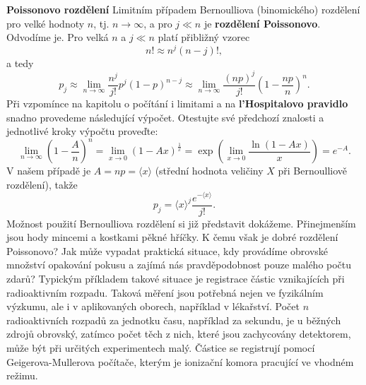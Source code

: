 \wikitextrule
\begin{example}\label{mai:exam068}
  \textbf{Poissonovo rozdělení}\newline\small
  Limitním případem Bernoulliova (binomického) rozdělení pro velké hodnoty \(n\), tj. \(n 
  \rightarrow \infty\), a pro \(j \ll n\) je \textbf{rozdělení Poissonovo}. Odvodíme je. Pro velká 
  \(n\) a \(j \ll n\) platí přibližný vzorec
  \begin{equation*}
    n! \approx n^j(n-j)!,
  \end{equation*}
  a tedy
  \begin{equation*}
    p_j \approx \lim\limits_{n\rightarrow\infty}\dfrac{n^j}{j!}p^j(1-p)^{n - j}
        \approx \lim\limits_{n\rightarrow\infty}\dfrac{(np)^j}{j!}\left(1-\dfrac{np}{n}\right)^{n}.
  \end{equation*}
  Při vzpomínce na kapitolu o počítání i limitami a na \textbf{l’Hospitalovo pravidlo} snadno 
  provedeme následující výpočet. Otestujte své předchozí znalosti a jednotlivé kroky výpočtu 
  proveďte:
  \begin{equation*}
    \lim\limits_{n\rightarrow\infty}\left(1 - \dfrac{A}{n}\right)^n = 
    \lim\limits_{x\rightarrow0}\left(1 - Ax\right)^\frac{1}{x} =
    \exp\left(\lim\limits_{x\rightarrow0}\dfrac{\ln(1 - Ax)}{x}\right) = e^{-A}.
  \end{equation*}
  V našem případě je \(A = np = \langle x \rangle\) (střední hodnota veličiny \(X\) při 
  Bernoulliově rozdělení), takže
  \begin{equation}\label{mai:eq065}
    p_j = \langle x \rangle^j\dfrac{e^{-\langle x \rangle}}{j!}.
  \end{equation}
  Možnost použití Bernoulliova rozdělení si již představit dokážeme. Přinejmenším jsou hody mincemi 
  a kostkami pěkné hříčky. K čemu však je dobré rozdělení Poissonovo? Jak může vypadat praktická 
  situace, kdy provádíme obrovské množství opakování pokusu a zajímá nás pravděpodobnost pouze 
  malého počtu zdarů? Typickým příkladem takové situace je registrace částic vznikajících při 
  radioaktivním rozpadu. Taková měření jsou potřebná nejen ve fyzikálním výzkumu, ale i v 
  aplikovaných oborech, například v lékařství. Počet \(n\) radioaktivních rozpadů za jednotku času, 
  například za sekundu, je u běžných zdrojů obrovský, zatímco počet těch z nich, které jsou 
  zachycovány detektorem, může být při určitých experimentech malý. Částice se registrují
  pomocí Geigerova-Mullerova počítače, kterým je ionizační komora pracující ve vhodném režimu. 

\end{example}
